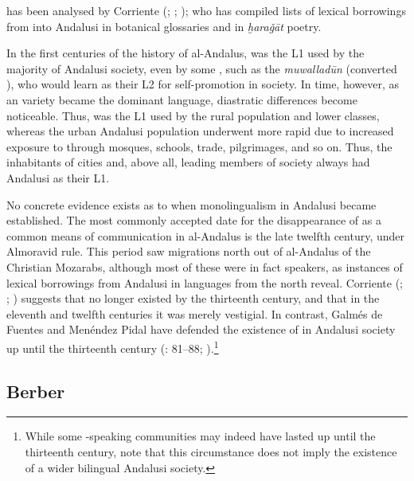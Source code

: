 \documentclass[output=paper,modfonts,nonflat]{langsci/langscibook}
\begin{document}
 has been analysed by Corriente (\citeyear{Corriente1995}; \citeyear{Corriente2000}; \citeyear{Corriente2012}); who has compiled lists of lexical borrowings from  into Andalusi  in botanical glossaries and in \textit{ḫaraǧāt} poetry.  

In the first centuries of the history of al-Andalus,  was the L1 used by the majority of Andalusi society, even by some , such as the \textit{muwalladūn} (converted ), who would learn  as their L2 for self-promotion in society. In time, however, as an  variety became the dominant language, diastratic differences become noticeable. Thus,  was the L1 used by the rural population and lower classes, whereas the urban Andalusi population underwent more rapid  due to increased exposure to  through mosques, schools, trade, pilgrimages, and so on. Thus, the inhabitants of cities and, above all, leading members of society always had Andalusi  as their L1. 

No concrete evidence exists as to when monolingualism in Andalusi  became established. The most commonly accepted date for the disappearance of  as a common means of communication in al-Andalus is the late twelfth century, under Almoravid rule. This period saw migrations north out of al-Andalus of the Christian Mozarabs, although most of these were in fact  speakers, as instances of lexical borrowings from Andalusi  in  languages from the north reveal. Corriente (\citeyear{Corriente1997dictionary}; \citeyear[443]{Corriente1992book}; \citeyear{Corriente2005}) suggests that  no longer existed by the thirteenth century, and that in the eleventh and twelfth centuries it was merely vestigial. In contrast, Galmés de Fuentes and Menéndez Pidal have defended the existence of  in Andalusi society up until the thirteenth century (\citealt{GalmésdeFuentes1994}: 81–88; \citealt{MenéndezPidalGalmésdeFuentes2001}).\footnote{While some -speaking communities may indeed have lasted up until the thirteenth century, note that this circumstance does not imply the existence of a wider bilingual Andalusi society.} 

\subsection{Berber}
\end{document}
